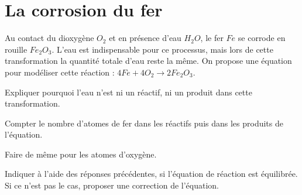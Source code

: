 
\section{La corrosion du fer}

Au contact du dioxygène $O_2$ et en présence d'eau $H_2O$, le fer $Fe$ se corrode en rouille $Fe_2O_3$. L'eau est indispensable pour ce processus, mais lors de cette transformation la quantité totale d'eau reste la même. On propose une équation pour modéliser cette réaction : $4 Fe + 4 O_2 \rightarrow 2 Fe_2O_3$.


\begin{questions}
	\question Expliquer pourquoi l'eau n'est ni un réactif, ni un produit dans cette transformation.
	\fillwithdottedlines{1.5cm}
	
	\question Compter le nombre d'atomes de fer dans les réactifs puis dans les produits de l'équation.
	\fillwithdottedlines{1.5cm}
	
	\question Faire de même pour les atomes d'oxygène.
	\fillwithdottedlines{1.5cm}
	
	\question Indiquer à l'aide des réponses précédentes, si l'équation de réaction est équilibrée. Si ce n'est pas le cas, proposer une correction de l'équation.
	\fillwithdottedlines{2.5cm}
\end{questions}
